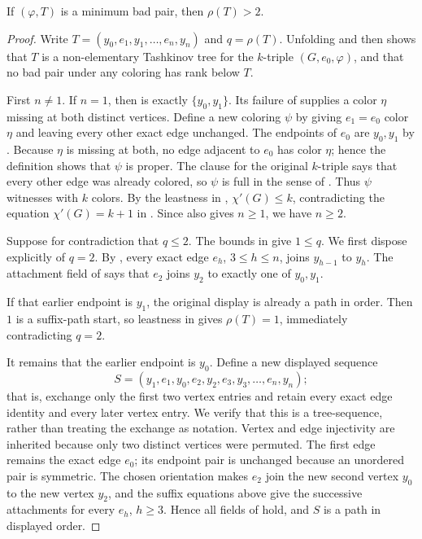 \begin{lemma}
If \((\varphi,T)\) is a minimum bad pair, then
\(\rho(T)>2\).
\end{lemma}
\begin{proof}
Write \(T=(y_0,e_1,y_1,\ldots,e_n,y_n)\) and \(q=\rho(T)\).  Unfolding
 and then 
shows that \(T\) is a non-elementary Tashkinov tree for the \(k\)-triple
\((G,e_0,\varphi)\), and that no bad pair under any coloring has rank
below \(T\).

First \(n\ne1\).  If \(n=1\), then
 is exactly \(\{y_0,y_1\}\).  Its failure
of  supplies a color \(\eta\) missing
at both distinct vertices.  Define a new coloring \(\psi\) by giving
\(e_1=e_0\) color \(\eta\) and leaving every other exact edge unchanged.
The endpoints of \(e_0\) are \(y_0,y_1\) by
.  Because \(\eta\) is missing at both, no edge
adjacent to \(e_0\) has color \(\eta\); hence the definition
 shows that \(\psi\) is proper.  The clause
 for the original \(k\)-triple says that
every other edge was already colored, so \(\psi\) is full in the sense of
.  Thus \(\psi\) witnesses
 with \(k\) colors.  By the leastness in
, \(\chi'(G)\le k\), contradicting the equation
\(\chi'(G)=k+1\) in .  Since
 also gives \(n\ge1\), we have \(n\ge2\).

Suppose for contradiction that \(q\le2\).  The bounds in
 give \(1\le q\).  We first dispose explicitly
of \(q=2\).  By , every exact edge
\(e_h\), \(3\le h\le n\), joins \(y_{h-1}\) to \(y_h\).  The attachment
field of  says that \(e_2\) joins \(y_2\) to
exactly one of \(y_0,y_1\).

If that earlier endpoint is \(y_1\), the original display is already a
path in order.  Then \(1\) is a suffix-path start, so leastness in
 gives \(\rho(T)=1\), immediately
contradicting \(q=2\).

It remains that the earlier endpoint is \(y_0\).  Define a new displayed
sequence
\[
 S=(y_1,e_1,y_0,e_2,y_2,e_3,y_3,\ldots,e_n,y_n);
\]
that is, exchange only the first two vertex entries and retain every exact
edge identity and every later vertex entry.  We verify that this is a
tree-sequence, rather than treating the exchange as notation.
Vertex and edge injectivity are inherited because only two distinct
vertices were permuted.  The first edge remains the exact edge \(e_0\);
its endpoint pair is unchanged because an unordered pair is symmetric.
The chosen orientation makes \(e_2\) join the new second vertex \(y_0\)
to the new vertex \(y_2\), and the suffix equations above give the
successive attachments for every \(e_h\), \(h\ge3\).  Hence all fields of
 hold, and \(S\) is a path in displayed order.


\end{proof}
